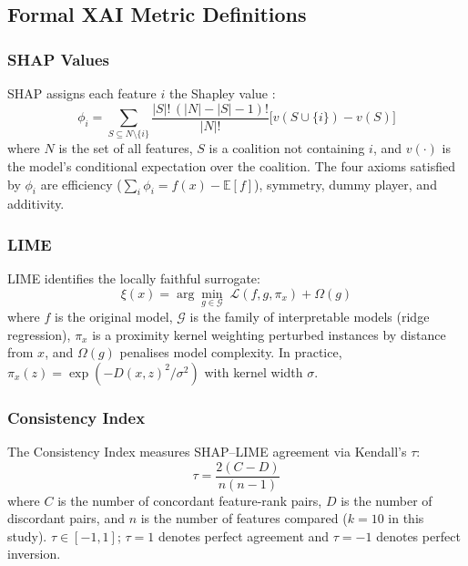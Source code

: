 \documentclass[conference]{IEEEtran}
\begin{document}
\subsection{Formal XAI Metric Definitions}

\subsubsection{SHAP Values}
SHAP assigns each feature $i$ the Shapley value \cite{shapley1953}:
\begin{equation}
  \phi_i = \sum_{S \subseteq N \setminus \{i\}}
    \frac{|S|!\,(|N|-|S|-1)!}{|N|!}
    \bigl[v(S \cup \{i\}) - v(S)\bigr]
  \label{eq:shap}
\end{equation}
where $N$ is the set of all features, $S$ is a coalition not containing $i$, and $v(\cdot)$ is the model's conditional expectation over the coalition. The four axioms satisfied by $\phi_i$ are efficiency ($\sum_i \phi_i = f(x) - \mathbb{E}[f]$), symmetry, dummy player, and additivity.

\subsubsection{LIME}
LIME identifies the locally faithful surrogate:
\begin{equation}
  \xi(x) = \arg\min_{g \in \mathcal{G}}\;
    \mathcal{L}(f, g, \pi_x) + \Omega(g)
  \label{eq:lime}
\end{equation}
where $f$ is the original model, $\mathcal{G}$ is the family of interpretable models (ridge regression), $\pi_x$ is a proximity kernel weighting perturbed instances by distance from $x$, and $\Omega(g)$ penalises model complexity. In practice, $\pi_x(z) = \exp(-D(x,z)^2 / \sigma^2)$ with kernel width $\sigma$.

\subsubsection{Consistency Index}
The Consistency Index measures SHAP--LIME agreement via Kendall's $\tau$:
\begin{equation}
  \tau = \frac{2(C - D)}{n(n-1)}
  \label{eq:tau}
\end{equation}
where $C$ is the number of concordant feature-rank pairs, $D$ is the number of discordant pairs, and $n$ is the number of features compared ($k=10$ in this study). $\tau \in [-1, 1]$; $\tau = 1$ denotes perfect agreement and $\tau = -1$ denotes perfect inversion.
\end{document}
